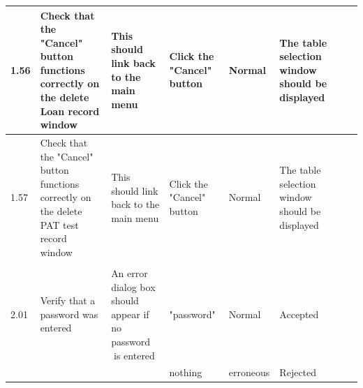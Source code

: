 \begin{landscape}
\begin{center}
\begin{longtable}{|p{1.5cm}|p{2cm}|p{3cm}|p{2cm}|p{2cm}|p{2.5cm}|p{2cm}|p{2cm}|}
        1.56 & Check that the "Cancel" button functions correctly on the delete Loan record window & This should link back to the main menu & Click the "Cancel" 
        button & Normal & The table selection window should be displayed & & \\ \hline
        
        1.57 & Check that the "Cancel" button functions correctly on the delete PAT test record window & This should link back to the main menu & Click the "Cancel" 
        button & Normal & The table selection window should be displayed & & \\ \hline
        
        & & & & & & & \\ \hline
        
        2.01 & Verify that a password was entered & An error dialog box should appear if no password is entered & "password" & Normal & Accepted & & \\
             &                                    &                                                             &  nothing   & erroneous & Rejected & & \\ \hline
             
             
    \end{longtable}
\end{center}
\end{landscape}
